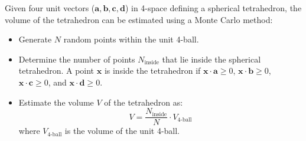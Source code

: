 \documentclass{article}
\begin{document}
Given four unit vectors ($ \mathbf{a}, \mathbf{b}, \mathbf{c}, \mathbf{d} $) in 4-space defining a spherical tetrahedron, the volume of the tetrahedron can be estimated using a Monte Carlo method:

\begin{itemize}
\item Generate $ N $ random points within the unit 4-ball. 

\item Determine the number of points $ N_{\text{inside}} $ that lie inside the spherical tetrahedron. A point $ \mathbf{x} $ is inside the tetrahedron if $ \mathbf{x} \cdot \mathbf{a} \geq 0 $, $ \mathbf{x} \cdot \mathbf{b} \geq 0 $, $ \mathbf{x} \cdot \mathbf{c} \geq 0 $, and $ \mathbf{x} \cdot \mathbf{d} \geq 0 $. \item Estimate the volume $ V $ of the tetrahedron as: \[ V = \frac{N_{\text{inside}}}{N} \cdot V_{\text{4-ball}} \] where $ V_{\text{4-ball}} $ is the volume of the unit 4-ball.
\end{itemize} 
\end{document}
